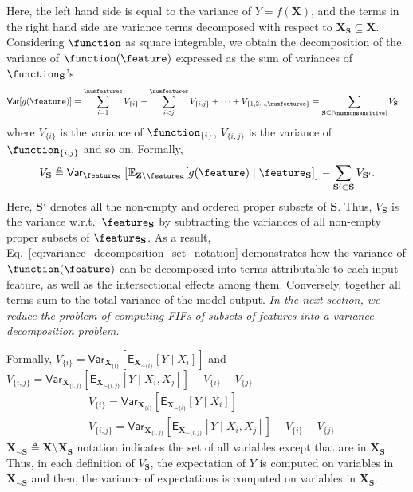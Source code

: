 Here, the left hand side is equal to the variance of $ Y = f(\mathbf{X}) $, and the terms in the right hand side are variance terms decomposed with respect to  $ \mathbf{X}_{\mathbf{S}} \subseteq \mathbf{X} $. 
\fi
Considering $ \function $ as square integrable, we obtain the decomposition of the variance of $ \function(\feature) $ expressed as the sum of variances of $\function_{\mathbf{S}}$'s~\citep{sobol1990sensitivity}.
\begin{align}\label{eq:variance_decomposition_set_notation}
	\mathsf{Var}[g(\feature)] &= \sum_{i=1}^{\numfeatures}V_{\{i\}} +  \sum_{i<j}^{\numfeatures} V_{\{i,j\}}  + \dots +  V_{\{1, 2\dots, \numfeatures\}}= \sum_{\mathbf{S} \subseteq [\numnonsensitive]} V_{\mathbf{S}} 
\end{align}
where $ V_{\{i\}} $ is the variance of $ \function_{\{i\}} $, $ V_{\{i,j\}} $ is the variance of $ \function_{\{i,j\}} $ and so on. Formally,  
\begin{equation}
\label{eq:decomposed_variance}
V_{\mathbf{S}} \triangleq \mathsf{Var} _{\feature_{\mathbf{S}}}\left[\mathbb{E}_{{\textbf {Z}}\setminus\feature_{\mathbf{S}}}[g(\feature)\mid \feature_{\mathbf{S}}]\right]- \sum_{\mathbf{S}' \subset \mathbf{S}}{V} _{\mathbf{S}'}.
\end{equation} 
Here, $\mathbf{S}'$ denotes all the non-empty and ordered proper subsets of $\mathbf{S}$. Thus, $ V_{\mathbf{S}} $ is the variance w.r.t.\ $ \feature_{\mathbf{S}} $ by subtracting the variances of all non-empty proper subsets of $ \feature_{\mathbf{S}} $. As a result, Eq.~\eqref{eq:variance_decomposition_set_notation} demonstrates how the variance of $\function(\feature) $ can be decomposed into terms attributable to each input feature, as well as the intersectional effects among them. Conversely, together all terms sum to the total variance of the model output. 
\textit{In the next section, we reduce the problem of computing FIFs of subsets of features into a variance decomposition problem.}

\iffalse

Formally, $V_{\{i\}} = \mathsf{Var}_{\mathbf{X}_{\{i\}}}[\mathsf{E}_{\mathbf{X}_{\sim \{i\}}}[Y \mid X_i]]$ and $V_{\{i,j\}} = \mathsf{Var}_{\mathbf{X}_{\{i,j\}}}[\mathsf{E}_{\mathbf{X}_{\sim \{i,j\}}}[Y \mid X_i, X_j]] - V_{\{i\}} - V_{\{j\}}$
\begin{align*}
	& V_{\{i\}} = \mathsf{Var}_{\mathbf{X}_{\{i\}}}[\mathsf{E}_{\mathbf{X}_{\sim \{i\}}}[Y \mid X_i]]\\
	& V_{\{i,j\}} = \mathsf{Var}_{\mathbf{X}_{\{i,j\}}}[\mathsf{E}_{\mathbf{X}_{\sim \{i,j\}}}[Y \mid X_i, X_j]] - V_{\{i\}} - V_{\{j\}}%
\end{align*}
$ \mathbf{X}_{\sim \mathbf{S}} \triangleq \mathbf{X} \setminus \mathbf{X}_{\mathbf{S}} $ notation indicates the set of all variables except that are in  $ \mathbf{X}_{\mathbf{S}} $. Thus, in each definition of $ V_{\mathbf{S}} $, the expectation of $ Y $ is computed on variables in $ \mathbf{X}_{\sim \mathbf{S}} $ and then, the variance of expectations is computed on variables in $ \mathbf{X}_{\mathbf{S}} $. 


